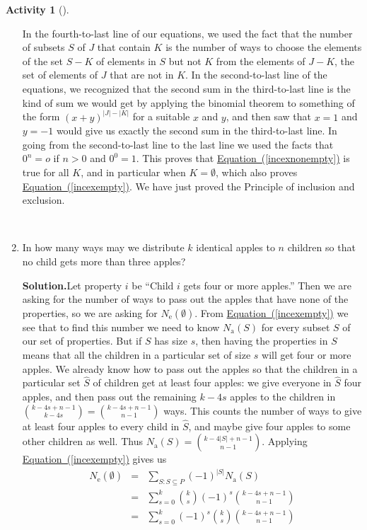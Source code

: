 \documentclass[10pt,]{book}
\theoremstyle{plain}
\theoremstyle{definition}
\newtheorem{activity}[project]{Activity}
\numberwithin{equation}{chapter}
\newcommand{\amp}{&}
\begin{document}
\begin{activity}[]
\begin{enumerate}[label=(\alph*)]
%
\par
In the fourth-to-last line of our equations, we used the fact that the number of subsets \(S\) of \(J\) that contain \(K\) is the number of ways to choose the elements of the set \(S-K\) of elements in \(S\) but not \(K\) from the elements of \(J-K\), the set of elements of \(J\) that are not in \(K\). In the second-to-last line of the equations, we recognized that the second sum in the third-to-last line is the kind of sum we would get by applying the binomial theorem to something of the form \((x+y)^{|J|-|K|}\) for a suitable \(x\) and \(y\), and then saw that \(x=1\) and \(y=-1\) would give us exactly the second sum in the third-to-last line. In going from the second-to-last line to the last line we used the facts that \(0^n=o\) if \(n>0\) and \(0^0=1\). This proves that \hyperref[incexnonempty]{Equation~(\ref{incexnonempty})} is true for all \(K\), and in particular when \(K=\emptyset\), which also proves \hyperref[incexempty]{Equation~(\ref{incexempty})}. We have just proved the Principle of inclusion and exclusion.%

~\par
\item In how many ways may we distribute \(k\) identical apples to \(n\) children so that no child gets more than three apples?%
\par\medskip\noindent%
\textbf{Solution.}\quad Let property \(i\) be ``Child \(i\) gets four or more apples.'' Then we are asking for the number of ways to pass out the apples that have none of the properties, so we are asking for \(N_{\mbox{e} }(\emptyset)\). From \hyperref[incexempty]{Equation~(\ref{incexempty})} we see that to find this number we need to know \(N_{\mbox{a} }(S)\) for every subset \(S\) of our set of properties. But if \(S\) has size \(s\), then having the properties in \(S\) means that all the children in a particular set of size \(s\) will get four or more apples. We already know how to pass out the apples so that the children in a particular set \(\hat S\) of children get at least four apples: we give everyone in \(\hat
S\) four apples, and then pass out the remaining \(k-4s\) apples to the children in \({k-4s+n-1\choose k-4s}= {k-4s+n-1\choose n-1}\) ways. This counts the number of ways to give at least four apples to every child in \(\hat S\), and maybe give four apples to some other children as well. Thus \(N_{\mbox{a} }(S) = {k-4|S|+n-1\choose n-1}\). Applying \hyperref[incexempty]{Equation~(\ref{incexempty})} gives us%
\begin{align*}
N_{\mbox{e} }(\emptyset)\amp =\amp \sum_{S:S\subseteq
P}(-1)^{|S|}N_{\mbox{a} }(S)\\
\amp =\amp \sum_{s=0}^k {k\choose s}(-1)^s {k-4s+n-1\choose n-1}\\
\amp =\amp \sum_{s=0}^k (-1)^s{k\choose s}{k-4s+n-1\choose n-1}
\end{align*}
%

\end{enumerate}
\end{activity}
\end{document}
